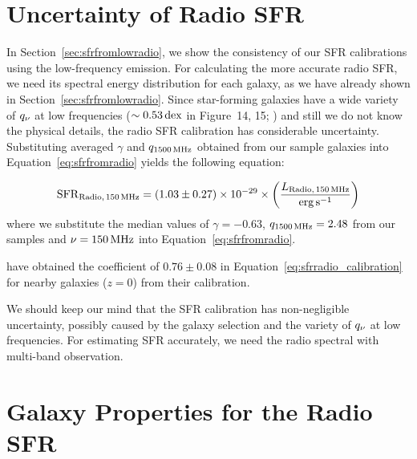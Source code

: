 \section{Uncertainty of Radio SFR}\label{sec:radiosfruncertainty}

In Section~\ref{sec:sfrfromlowradio}, we show the consistency of our SFR calibrations using the low-frequency emission.
For calculating the more accurate radio SFR, we need its spectral energy distribution for each galaxy, as we have already shown in Section~\ref{sec:sfrfromlowradio}.
Since star-forming galaxies have a wide variety of $q_{\nu}$ at low frequencies ($\sim 0.53\,\mathrm{dex}$ in Figure~14, 15; \citealt{CalistroRivera2017a}) and still we do not know the physical details, the radio SFR calibration has considerable uncertainty.
Substituting averaged $\gamma$ and $q_{\mathrm{1500\,\mathrm{MHz}}}$ obtained from our sample galaxies into Equation~\ref{eq:sfrfromradio} yields the following equation:

\begin{equation}\label{eq:sfrradio_calibration}
    \mathrm{SFR}_{\mathrm{Radio},\,150\,\mathrm{MHz}} = \left(1.03\pm0.27\right) \times 10^{-29} \times \left(\frac{L_{\mathrm{Radio},\,150\,\mathrm{MHz}}}{\mathrm{erg}\,\mathrm{s}^{-1}}\right)
\end{equation}
where we substitute the median values of $\gamma=-0.63$, $q_{\mathrm{1500\,\mathrm{MHz}}}=2.48$ from our samples and $\nu=150\,\mathrm{MHz}$ into Equation~\ref{eq:sfrfromradio}.

\citet{CalistroRivera2017a} have obtained the coefficient of $0.76 \pm 0.08$ in Equation~\ref{eq:sfrradio_calibration} for nearby galaxies ($z = 0$) from their calibration.

We should keep our mind that the SFR calibration has non-negligible uncertainty, possibly caused by the galaxy selection and the variety of $q_{\nu}$ at low frequencies.
For estimating SFR accurately, we need the radio spectral with multi-band observation.



\section{Galaxy Properties for the Radio SFR}\label{sec:galaxypropertiesfortheradiosfr}

